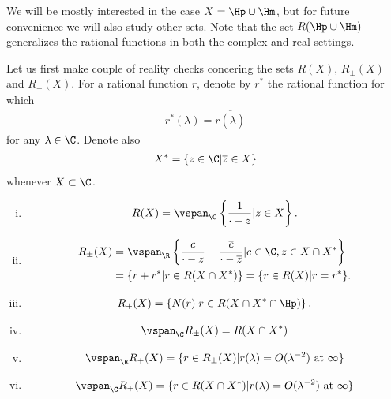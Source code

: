 We will be mostly interested in the case $X = \Hp \cup \Hm$, but for future convenience we will also study other sets. Note that the set $R(\Hp \cup \Hm)$ generalizes the rational functions in both the complex and real settings.

Let us first make couple of reality checks concering the sets $R(X)$, $R_{\pm}(X)$ and $R_{+}(X)$. For a rational function $r$, denote by $r^{*}$ the rational function for which
\begin{align*}
	r^{*}(\lambda) = \overline{r(\overline{\lambda})}
\end{align*}
for any $\lambda \in \C$. Denote also
\begin{align*}
	X^{*} = \{z \in \C | \overline{z} \in X \}
\end{align*}
whenever $X \subset \C$.

\begin{prop}\label{pick_functional_span}
	\begin{enumerate}[(i)]
		\item
		\begin{align*}
			R(X) = \vspan_{\C} \left\{\frac{1}{\cdot - z} | z \in X \right\}.
		\end{align*}
		\item
		\begin{align*}
			R_{\pm}(X) &= \vspan_{\R} \left\{\frac{c}{\cdot - z} + \frac{\overline{c}}{\cdot - \overline{z}} | c \in \C, z \in X \cap X^{*} \right\} \\
			&= \{r + r^{*} | r \in R(X \cap X^{*}) \} = \{r \in R(X) | r = r^{*}\}.
		\end{align*}
		\item
		\begin{align*}
			R_{+}(X) = \left\{ N(r) | r \in R(X \cap X^{*} \cap \Hp) \right\}.
		\end{align*}
		\item
		\begin{align*}
			\vspan_{\C} R_{\pm}(X) = R(X \cap X^{*})
		\end{align*}
		\item
		\begin{align*}
			\vspan_{\R} R_{+}(X) = \{r \in R_{\pm}(X) | r(\lambda) = O(\lambda^{-2}) \text{ at }\infty\}
		\end{align*}
		\item
		\begin{align*}
			\vspan_{\C} R_{+}(X) = \{r \in R(X \cap X^{*}) | r(\lambda) = O(\lambda^{-2}) \text{ at }\infty\}
		\end{align*}
	\end{enumerate}
\end{prop}
